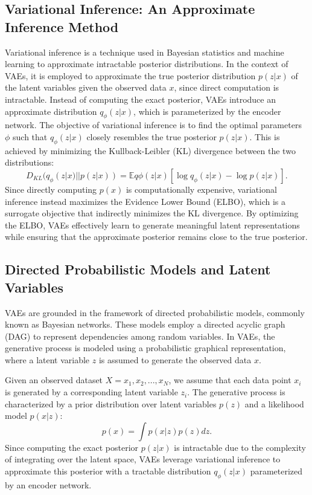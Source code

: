\subsection{Variational Inference: An Approximate Inference Method} 
Variational inference is a technique used in Bayesian statistics and machine learning to approximate intractable posterior distributions. In the context of VAEs, it is employed to approximate the true posterior distribution $p(z|x)$ of the latent variables given the observed data $x$, since direct computation is intractable. Instead of computing the exact posterior, VAEs introduce an approximate distribution $q_\phi(z|x)$, which is parameterized by the encoder network. The objective of variational inference is to find the optimal parameters $\phi$ such that $q_\phi(z|x)$ closely resembles the true posterior $p(z|x)$. This is achieved by minimizing the Kullback-Leibler (KL) divergence between the two distributions:
\begin{equation}
D_{KL}(q_\phi(z|x) || p(z|x)) = \mathbb{E}{q\phi(z|x)}[\log q_\phi(z|x) - \log p(z|x)].
\end{equation}
Since directly computing $p(x)$ is computationally expensive, variational inference instead maximizes the Evidence Lower Bound (ELBO), which is a surrogate objective that indirectly minimizes the KL divergence. By optimizing the ELBO, VAEs effectively learn to generate meaningful latent representations while ensuring that the approximate posterior remains close to the true posterior.

\subsection{Directed Probabilistic Models and Latent Variables}

VAEs are grounded in the framework of directed probabilistic models, commonly known as Bayesian networks. These models employ a directed acyclic graph (DAG) to represent dependencies among random variables. In VAEs, the generative process is modeled using a probabilistic graphical representation, where a latent variable $z$ is assumed to generate the observed data $x$.

Given an observed dataset $X = {x_1, x_2, ..., x_N}$, we assume that each data point $x_i$ is generated by a corresponding latent variable $z_i$. The generative process is characterized by a prior distribution over latent variables $p(z)$ and a likelihood model $p(x|z)$:
\begin{equation}
p(x) = \int p(x|z) p(z) dz.
\end{equation}
Since computing the exact posterior $p(z|x)$ is intractable due to the complexity of integrating over the latent space, VAEs leverage variational inference to approximate this posterior with a tractable distribution $q_\phi(z|x)$ parameterized by an encoder network.

